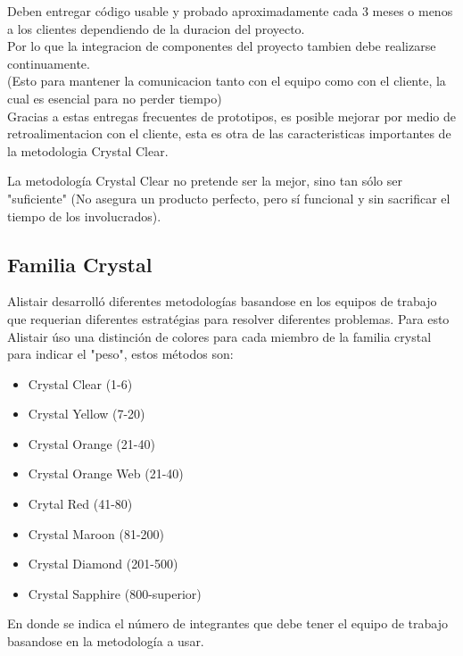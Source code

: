 \documentclass[12pt,a4paper]{article}
\begin{document}
	Deben entregar c\'odigo usable y probado aproximadamente cada 3 meses o menos a los clientes dependiendo de la duracion del proyecto.\\
	Por lo que la integracion de componentes del proyecto tambien debe realizarse continuamente.\\
	(Esto para mantener la comunicacion tanto con el equipo como con el cliente, la cual es esencial para no perder tiempo)\\
	
	Gracias a estas entregas frecuentes de prototipos, es posible mejorar por medio de retroalimentacion con el cliente, esta es otra de las caracteristicas importantes de la metodologia Crystal Clear.
	
	La metodolog\'ia Crystal Clear no pretende ser la mejor, sino tan s\'olo ser "suficiente" (No asegura un producto perfecto, pero sí funcional y sin sacrificar el tiempo de los involucrados).\\
	
	\subsection{Familia Crystal}
	Alistair desarroll\'o diferentes metodolog\'ias basandose en los equipos de trabajo que requerian diferentes estrat\'egias para resolver diferentes problemas.
	Para esto Alistair \'uso una distinci\'on de colores para cada miembro de la familia crystal para indicar el "peso", estos m\'etodos son:
	\begin{itemize}
		\item Crystal Clear  (1-6)
		\item Crystal Yellow (7-20)
		\item Crystal Orange (21-40)
		\item Crystal Orange Web (21-40)
		\item Crytal Red (41-80)
		\item Crystal Maroon (81-200)
		\item Crystal Diamond (201-500)
		\item Crystal Sapphire (800-superior)
	\end{itemize}
	  
	En donde se indica el n\'umero de integrantes que debe tener el equipo de trabajo basandose en la metodolog\'ia a usar.
	
\end{document}
